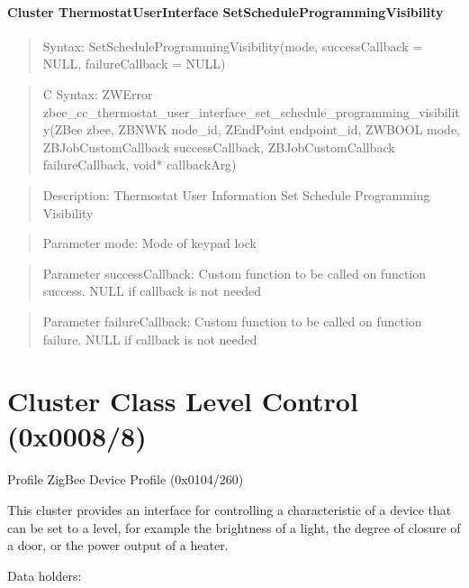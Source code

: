 \paragraph{Cluster ThermostatUserInterface SetScheduleProgrammingVisibility}
\begin{quote}Syntax: SetScheduleProgrammingVisibility(mode, successCallback = NULL, failureCallback = NULL)\end{quote}
\begin{quote}C Syntax: ZWError zbee\_cc\_thermostat\_user\_interface\_set\_schedule\_programming\_visibility(ZBee zbee, ZBNWK node\_id, ZEndPoint endpoint\_id, ZWBOOL mode, ZBJobCustomCallback successCallback, ZBJobCustomCallback failureCallback, void* callbackArg)\end{quote}
\begin{quote}Description: Thermostat User Information Set Schedule Programming Visibility\end{quote}
\begin{quote}Parameter mode: Mode of keypad lock\end{quote}
\begin{quote}Parameter successCallback: Custom function to be called on function success. NULL if callback is not needed\end{quote}
\begin{quote}Parameter failureCallback: Custom function to be called on function failure. NULL if callback is not needed\end{quote}



\section{Cluster Class Level Control (0x0008/8)}

Profile ZigBee Device Profile (0x0104/260)

This cluster provides an interface for controlling a characteristic of a device that can be set to a level, for example the brightness of a light, the degree of closure of a door, or the power output of a heater.
\newline

\noindent
Data holders:


